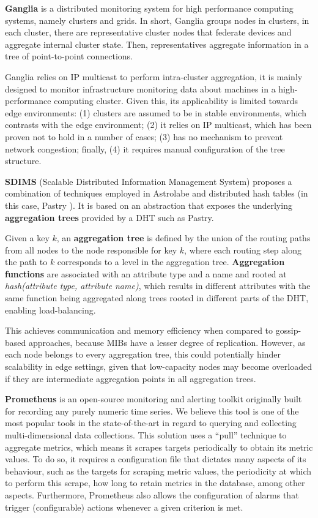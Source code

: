 \textbf{Ganglia} \cite{massie2004ganglia} is a distributed monitoring system for high performance computing systems, namely clusters and grids. In short, Ganglia groups nodes in clusters, in each cluster, there are representative cluster nodes that federate devices and aggregate internal cluster state. Then, representatives aggregate information in a tree of point-to-point connections.

Ganglia relies on IP multicast to perform intra-cluster aggregation, it is mainly designed to monitor infrastructure monitoring data about machines in a high-performance computing cluster. Given this, its applicability is limited towards edge environments: (1) clusters are assumed to be in stable environments, which contrasts with the edge environment; (2) it relies on IP multicast, which has been proven not to hold in a number of cases; (3) has no mechanism to prevent network congestion; finally, (4) it requires manual configuration of the tree structure.

\textbf{SDIMS} \cite{SDIMS} (Scalable Distributed Information Management System) proposes a combination of techniques employed in Astrolabe \cite{Renesse2003} and distributed hash tables (in this case, Pastry \cite{rowstron2001pastry}). It is based on an abstraction that exposes the underlying \textbf{aggregation trees} provided by a DHT such as Pastry. 

Given a key $k$, an \textbf{aggregation tree} is defined by the union of the routing paths from all nodes to the node responsible for key $k$, where each routing step along the path to $k$ corresponds to a level in the aggregation tree. \textbf{Aggregation functions} are associated with an attribute type and a name and rooted at \textit{hash(attribute type, attribute name)}, which results in different attributes with the same function being aggregated along trees rooted in different parts of the DHT, enabling load-balancing.

This achieves communication and memory efficiency when compared to gossip-based approaches, because MIBs have a lesser degree of replication. However, as each node belongs to every aggregation tree, this could potentially hinder scalability in edge settings, given that low-capacity nodes may become overloaded if they are intermediate aggregation points in all aggregation trees. 

\textbf{Prometheus} \cite{prometheus} is an open-source monitoring and alerting toolkit originally built for recording any purely numeric time series. We believe this tool is one of the most popular tools in the state-of-the-art in regard to querying and collecting multi-dimensional data collections. This solution uses a ``pull'' technique to aggregate metrics, which means it scrapes targets periodically to obtain its metric values. To do so, it requires a configuration file that dictates many aspects of its behaviour, such as the targets for scraping metric values, the periodicity at which to perform this scrape, how long to retain metrics in the database, among other aspects. Furthermore, Prometheus also allows the configuration of alarms that trigger (configurable) actions whenever a given criterion is met. 

